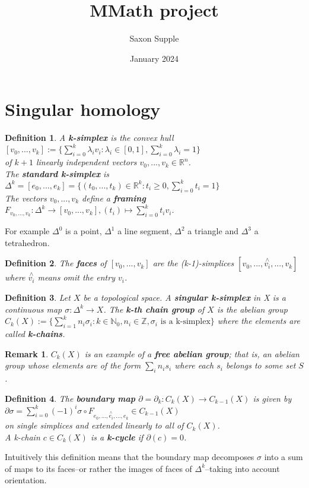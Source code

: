 \documentclass{report}
\title{MMath project}
\author{Saxon Supple }
\date{January 2024}
\newtheorem{definition}{Definition}
\newtheorem{remark}{Remark}
\begin{document}
\maketitle

\section{Singular homology}
\begin{definition}
A \textbf{k-simplex} is the convex hull\\
$[v_0,...,v_k]:=\{\sum_{i=0}^k\lambda_iv_i:\lambda_i\in [0,1],\sum_{i=0}^k\lambda_i=1\}$\\
of $k+1$ linearly independent vectors $v_0,...,v_k\in\mathbb{R}^n$.\\
The \textbf{standard k-simplex} is\\$\Delta^k=[e_0,...,e_k]=\{(t_0,...,t_k)\in\mathbb{R}^k:t_i\geq 0, \sum_{i=0}^kt_i=1\}$\\
The vectors $v_0,...,v_k$ define a \textbf{framing} $F_{v_0,...,v_k}\colon\Delta^k\rightarrow [v_0,...,v_k],(t_i)\mapsto \sum_{i=0}^kt_iv_i$.
\end{definition}


\noindent For example $\Delta^0$ is a point, $\Delta^1$ a line segment, $\Delta^2$ a triangle and $\Delta^3$ a tetrahedron.

\begin{definition}
The \textbf{faces} of $[v_0,...,v_k]$ are the (k-1)-simplices $[v_0,...,\overset{\wedge}{v_i},...,v_k]$ where $\overset{\wedge}{v_i}$ means omit the entry $v_i$.
\end{definition}

\begin{definition}
Let $X$ be a topological space. A \textbf{singular k-simplex} in X is a continuous map $\sigma\colon\Delta^k\to X$. The \textbf{k-th chain group} of $X$ is the abelian group\\
$C_k(X):=\{\sum_{i=1}^kn_i\sigma_i:k\in\mathbb{N}_0,n_i\in\mathbb{Z},\sigma_i \text{ is a k-simplex}\}$ where the elements are called \textbf{k-chains}.
\end{definition}
\begin{remark}
$C_k(X)$ is an example of a \textbf{free abelian group}; that is, an abelian group whose elements are of the form $\sum_in_is_i$ where each $s_i$ belongs to some set $S$.
\end{remark}


\begin{definition}
The \textbf{boundary map} $\partial=\partial_k\colon C_k(X)\to C_{k-1}(X)$ is given by\\
$\partial\sigma=\sum_{i=0}^k(-1)^i\sigma\circ F_{e_0,...,\overset{\wedge}{e_i},...,e_k}\in C_{k-1}(X)$\\
on single simplices and extended linearly to all of $C_k(X)$.\\
A k-chain $c\in C_k(X)$ is a \textbf{k-cycle} if $\partial(c)=0$.
\end{definition}
\noindent Intuitively this definition means that the boundary map decomposes $\sigma$ into a sum of maps to its faces--or rather the images of faces of $\Delta^k$--taking into account orientation.
\end{document}
